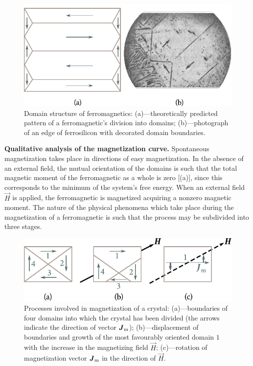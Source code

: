 \begin{figure}[t]
	\begin{center}
		\includegraphics[scale=1]{figures/ch_07/fig_7_19.pdf}
		\caption[]{Domain structure of ferromagnetics: (a)---theoretically predicted pattern of a ferromagnetic's division into domains; (b)---photograph of an edge of ferrosilicon with decorated domain boundaries.}
		\label{fig:7_19}
	\end{center}
	\vspace{-0.8cm}
\end{figure}

\textbf{Qualitative analysis of the magnetization curve.} Spontaneous magnetization takes place in directions of easy magnetization. In the absence of an external field, the mutual orientation of the domains is such that the total magnetic moment of the ferromagnetic as a whole is zero [(a)], since this corresponds to the minimum of the system's free energy. When an external field $\vec{H}$ is applied, the ferromagnetic is magnetized acquiring a nonzero magnetic moment. The nature of the physical phenomena which take place during the magnetization of a ferromagnetic is such that the process may be subdivided into three stages.

\begin{figure}[t]
	\begin{center}
		\includegraphics[scale=1]{figures/ch_07/fig_7_20.pdf}
		\caption[]{Processes involved in magnetization of a crystal: (a)---boundaries of four domains into which the crystal has been divided (the arrows indicate the direction of vector $\boldsymbol{J}_{\text{m}}$); (b)---displacement of boundaries and growth of the most favourably oriented domain $1$ with the increase in the magnetizing field $\vec{H}$; (c)---rotation of magnetization vector $\boldsymbol{J}_{\text{m}}$ in the direction of $\vec{H}$.}
		\label{fig:7_20}
	\end{center}
	\vspace{-0.7cm}
\end{figure}

